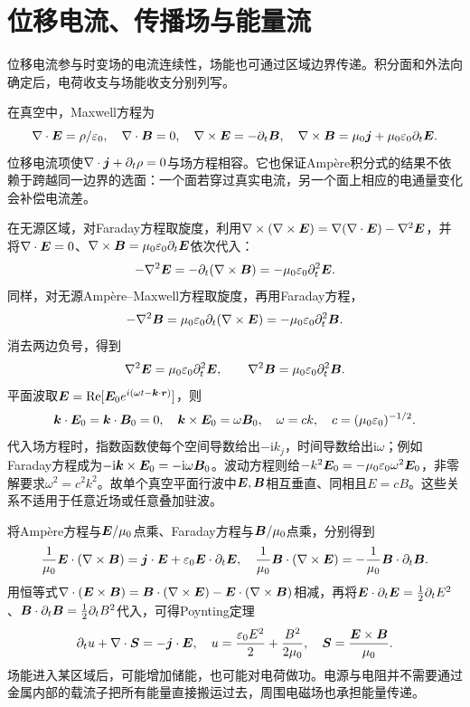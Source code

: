 \section{位移电流、传播场与能量流}\label{sec:i4-wave}
位移电流参与时变场的电流连续性，场能也可通过区域边界传递。积分面和外法向确定后，电荷收支与场能收支分别列写。

在真空中，Maxwell方程为
\[
\nabla\cdot\bm{E}=\rho/\varepsilon_0,\quad \nabla\cdot\bm{B}=0,\quad
\nabla\times\bm{E}=-\partial_t\bm{B},\quad
\nabla\times\bm{B}=\mu_0\bm{j}+\mu_0\varepsilon_0\partial_t\bm{E}.
\]
位移电流项使$\nabla\cdot\bm{j}+\partial_t\rho=0$与场方程相容。它也保证Ampère积分式的结果不依赖于跨越同一边界的选面：一个面若穿过真实电流，另一个面上相应的电通量变化会补偿电流差。

在无源区域，对Faraday方程取旋度，利用$\nabla\times(\nabla\times\bm{E})=\nabla(\nabla\cdot\bm{E})-\nabla^2\bm{E}$，并将$\nabla\cdot\bm{E}=0$、$\nabla\times\bm{B}=\mu_0\varepsilon_0\partial_t\bm{E}$依次代入：
\[-\nabla^2\bm{E}=-\partial_t(\nabla\times\bm{B})
=-\mu_0\varepsilon_0\partial_t^2\bm{E}.\]
同样，对无源Ampère--Maxwell方程取旋度，再用Faraday方程，
\[-\nabla^2\bm{B}=\mu_0\varepsilon_0\partial_t(\nabla\times\bm{E})
=-\mu_0\varepsilon_0\partial_t^2\bm{B}.\]
消去两边负号，得到
\[
\nabla^2\bm{E}=\mu_0\varepsilon_0\partial_t^2\bm{E},\qquad
\nabla^2\bm{B}=\mu_0\varepsilon_0\partial_t^2\bm{B}.
\]
平面波取$\bm{E}=\operatorname{Re}[\bm{E}_0e^{i(\omega t-\bm{k}\cdot\bm{r})}]$，则
\[
\bm{k}\cdot\bm{E}_0=\bm{k}\cdot\bm{B}_0=0,\quad
\bm{k}\times\bm{E}_0=\omega\bm{B}_0,\quad \omega=ck,\quad
c=(\mu_0\varepsilon_0)^{-1/2}.
\]
代入场方程时，指数函数使每个空间导数给出$-\mathrm i k_j$，时间导数给出$\mathrm i\omega$；例如Faraday方程成为$-\mathrm i\bm{k}\times\bm{E}_0=-\mathrm i\omega\bm{B}_0$。波动方程则给$-k^2\bm{E}_0=-\mu_0\varepsilon_0\omega^2\bm{E}_0$，非零解要求$\omega^2=c^2k^2$。故单个真空平面行波中$\bm{E},\bm{B}$相互垂直、同相且$E=cB$。这些关系不适用于任意近场或任意叠加驻波。

将Ampère方程与$\bm{E}/\mu_0$点乘、Faraday方程与$\bm{B}/\mu_0$点乘，分别得到
\[\frac1{\mu_0}\bm{E}\cdot(\nabla\times\bm{B})
=\bm{j}\cdot\bm{E}+\varepsilon_0\bm{E}\cdot\partial_t\bm{E},
\quad \frac1{\mu_0}\bm{B}\cdot(\nabla\times\bm{E})
=-\frac1{\mu_0}\bm{B}\cdot\partial_t\bm{B}.\]
用恒等式$\nabla\cdot(\bm{E}\times\bm{B})=\bm{B}\cdot(\nabla\times\bm{E})-\bm{E}\cdot(\nabla\times\bm{B})$相减，再将$\bm{E}\cdot\partial_t\bm{E}=\tfrac12\partial_tE^2$、$\bm{B}\cdot\partial_t\bm{B}=\tfrac12\partial_tB^2$代入，可得Poynting定理
\[
\partial_tu+\nabla\cdot\bm{S}=-\bm{j}\cdot\bm{E},\quad
u=\frac{\varepsilon_0E^2}{2}+\frac{B^2}{2\mu_0},\quad
\bm{S}=\frac{\bm{E}\times\bm{B}}{\mu_0}.
\]
场能进入某区域后，可能增加储能，也可能对电荷做功。电源与电阻并不需要通过金属内部的载流子把所有能量直接搬运过去，周围电磁场也承担能量传递。


